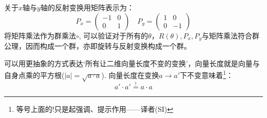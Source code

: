 关于$x$轴与$y$轴的反射变换用矩阵表示为：
\begin{equation}
\label{equ3.4}
P_x = 	\begin{pmatrix}
			-1 & 0 \\ 0 & 1
		\end{pmatrix}
\quad
P_y = 	\begin{pmatrix}
			1 & 0 \\ 0 & -1
		\end{pmatrix}
\end{equation}
将矩阵乘法作为群乘法$\circ$, 可以验证对于所有的$\theta$，$R(\theta), P_x, P_y$与矩阵乘法符合群公理，因而构成一个群，亦即旋转与反射变换构成一个群。

可以用更抽象的方式表达‘所有让二维向量长度不变的变换’，向量长度就是向量与自身点乘的平方根($|a| = \sqrt{a \cdot a}$). 向量长度在变换$a \rightarrow a'$下不变意味着\footnote{等号上面的!只是起强调、提示作用——译者(SI)}：
\begin{equation}
\label{equ3.5}
a' \cdot a' \stackrel{!}{=} a \cdot a
\end{equation}

